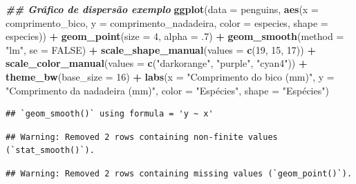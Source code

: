 \documentclass[
]{article}
\newenvironment{Shaded}{\begin{snugshade}}{\end{snugshade}}
\newcommand{\AttributeTok}[1]{\textcolor[rgb]{0.13,0.29,0.53}{#1}}
\newcommand{\ConstantTok}[1]{\textcolor[rgb]{0.56,0.35,0.01}{#1}}
\newcommand{\DecValTok}[1]{\textcolor[rgb]{0.00,0.00,0.81}{#1}}
\newcommand{\DocumentationTok}[1]{\textcolor[rgb]{0.56,0.35,0.01}{\textbf{\textit{#1}}}}
\newcommand{\FunctionTok}[1]{\textcolor[rgb]{0.13,0.29,0.53}{\textbf{#1}}}
\newcommand{\NormalTok}[1]{#1}
\newcommand{\SpecialCharTok}[1]{\textcolor[rgb]{0.81,0.36,0.00}{\textbf{#1}}}
\newcommand{\StringTok}[1]{\textcolor[rgb]{0.31,0.60,0.02}{#1}}
\begin{document}
\begin{Shaded}
\begin{Highlighting}[]
\DocumentationTok{\#\# Gráfico de dispersão exemplo}
\FunctionTok{ggplot}\NormalTok{(}\AttributeTok{data =}\NormalTok{ penguins, }\FunctionTok{aes}\NormalTok{(}\AttributeTok{x =}\NormalTok{ comprimento\_bico, }\AttributeTok{y =}\NormalTok{ comprimento\_nadadeira,}
                            \AttributeTok{color =}\NormalTok{ especies, }\AttributeTok{shape =}\NormalTok{ especies)) }\SpecialCharTok{+}
    \FunctionTok{geom\_point}\NormalTok{(}\AttributeTok{size =} \DecValTok{4}\NormalTok{, }\AttributeTok{alpha =}\NormalTok{ .}\DecValTok{7}\NormalTok{) }\SpecialCharTok{+}
    \FunctionTok{geom\_smooth}\NormalTok{(}\AttributeTok{method =} \StringTok{"lm"}\NormalTok{, }\AttributeTok{se =} \ConstantTok{FALSE}\NormalTok{) }\SpecialCharTok{+}
    \FunctionTok{scale\_shape\_manual}\NormalTok{(}\AttributeTok{values =} \FunctionTok{c}\NormalTok{(}\DecValTok{19}\NormalTok{, }\DecValTok{15}\NormalTok{, }\DecValTok{17}\NormalTok{)) }\SpecialCharTok{+}
    \FunctionTok{scale\_color\_manual}\NormalTok{(}\AttributeTok{values =} \FunctionTok{c}\NormalTok{(}\StringTok{"darkorange"}\NormalTok{, }\StringTok{"purple"}\NormalTok{, }\StringTok{"cyan4"}\NormalTok{)) }\SpecialCharTok{+}
    \FunctionTok{theme\_bw}\NormalTok{(}\AttributeTok{base\_size =} \DecValTok{16}\NormalTok{) }\SpecialCharTok{+}
    \FunctionTok{labs}\NormalTok{(}\AttributeTok{x =} \StringTok{"Comprimento do bico (mm)"}\NormalTok{, }\AttributeTok{y =} \StringTok{"Comprimento da nadadeira (mm)"}\NormalTok{, }
         \AttributeTok{color =} \StringTok{"Espécies"}\NormalTok{, }\AttributeTok{shape =} \StringTok{"Espécies"}\NormalTok{)}
\end{Highlighting}
\end{Shaded}

\begin{verbatim}
## `geom_smooth()` using formula = 'y ~ x'
\end{verbatim}

\begin{verbatim}
## Warning: Removed 2 rows containing non-finite values (`stat_smooth()`).
\end{verbatim}

\begin{verbatim}
## Warning: Removed 2 rows containing missing values (`geom_point()`).
\end{verbatim}
\end{document}
